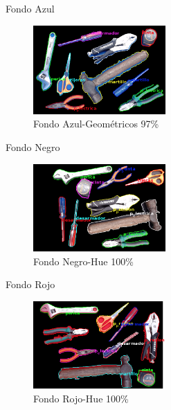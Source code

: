 \documentclass[
  24pt, %
]{beamer}
\begin{document}
\begin{frame}{Fondo Azul}
  \begin{figure}[h]
  \centering
  \includegraphics[width=0.45\textwidth,height=0.35\textheight]{resultados_colores/resultado_azul_geom_0_97}
  \caption{Fondo Azul-Geométricos 97\%}
  \end{figure}
\end{frame}

\begin{frame}{Fondo Negro}
  \begin{figure}[h]
  \centering
  \includegraphics[width=0.45\textwidth,height=0.35\textheight]{resultados_colores/resultado_negro_hue_1}
  \caption{Fondo Negro-Hue 100\%}
  \end{figure}
\end{frame}

\begin{frame}{Fondo Rojo}
  \begin{figure}[h]
  \centering
  \includegraphics[width=0.45\textwidth,height=0.35\textheight]{resultados_colores/resultado_rojo_hue_1}
  \caption{Fondo Rojo-Hue 100\%}
  \end{figure}
\end{frame}
\end{document}
